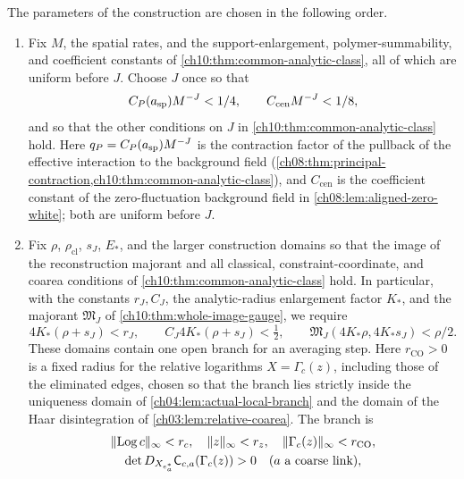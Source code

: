 \begin{definition}\label{ch11:def:literal-selection}
The parameters of the construction are chosen in the following order.
\begin{enumerate}
\item Fix $M$, the spatial rates, and the support-enlargement, polymer-summability, and coefficient constants of \cref{ch10:thm:common-analytic-class}, all of which are uniform before $J$. Choose $J$ once so that
\[
 C_P(a_{\mathrm{sp}})M^{-J}<1/4,\qquad C_{\mathrm{cen}}M^{-J}<1/8,
\]
and so that the other conditions on $J$ in \cref{ch10:thm:common-analytic-class} hold. Here $q_P=C_P(a_{\mathrm{sp}})M^{-J}$ is the contraction factor of the pullback of the effective interaction to the background field (\cref{ch08:thm:principal-contraction,ch10:thm:common-analytic-class}), and $C_{\mathrm{cen}}$ is the coefficient constant of the zero-fluctuation background field in \cref{ch08:lem:aligned-zero-white}; both are uniform before $J$.
\item Fix $\rho$, $\rho_{\mathrm{cl}}$, $s_J$, $E_*$, and the larger construction domains so that the image of the reconstruction majorant and all classical, constraint-coordinate, and coarea conditions of \cref{ch10:thm:common-analytic-class} hold. In particular, with the constants $r_J,C_J$, the analytic-radius enlargement factor $K_*$, and the majorant $\mathfrak M_J$ of \cref{ch10:thm:whole-image-gauge}, we require
\begin{equation}\label{ch11:eq:outer-reserve-gates}
 4K_*(\rho+s_J)<r_J,\qquad C_J4K_*(\rho+s_J)<\tfrac12,\qquad
 \mathfrak M_J(4K_*\rho,4K_*s_J)<\rho/2.
\end{equation}
These domains contain one open branch for an averaging step. Here $r_{\mathrm{CO}}>0$ is a fixed radius for the relative logarithms $X=\Gamma_c(z)$, including those of the eliminated edges, chosen so that the branch lies strictly inside the uniqueness domain of \cref{ch04:lem:actual-local-branch} and the domain of the Haar disintegration of \cref{ch03:lem:relative-coarea}. The branch is
\[
 \begin{gathered}
 \lVert \operatorname{Log} c\rVert_\infty<r_c,\quad \lVert z\rVert_\infty<r_z,\quad
 \lVert \Gamma_c(z)\rVert_\infty<r_{\mathrm{CO}},\\
 \det D_{X_{e^*_a}}\mathsf C_{c,a}(\Gamma_c(z))>0\quad(a\text{ a coarse link}),
 \end{gathered}
\]

\end{enumerate}
\end{definition}
